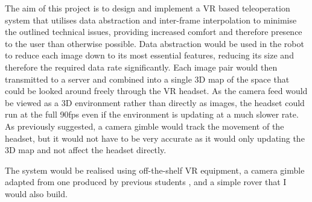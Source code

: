 The aim of this project is to design and implement a VR based teleoperation system that utilises data abstraction and inter-frame interpolation to minimise the outlined technical issues, providing increased comfort and therefore presence to the user than otherwise possible. Data abstraction would be used in the robot to reduce each image down to its most essential features, reducing its size and therefore the required data rate significantly. Each image pair would then transmitted to a server and combined into a single 3D map of the space that could be looked around freely through the VR headset. As the camera feed would be viewed as a 3D environment rather than directly as images, the headset could run at the full 90fps even if the environment is updating at a much slower rate. As previously suggested, a camera gimble would track the movement of the headset, but it would not have to be very accurate as it would only updating the 3D map and not affect the headset directly.

The system would be realised using off-the-shelf VR equipment, a camera gimble adapted from one produced by previous students \cite{gimble}, and a simple rover that I would also build.